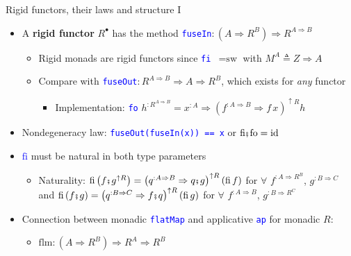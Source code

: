 \documentclass[english]{beamer}
\newcommand{\bef}{\hspace{0.5pt}\ensuremath\mathsmaller{\fatsemi}\hspace{1.5pt}}
\begin{document}
\begin{frame}{Rigid functors, their laws and structure I}

\begin{itemize}
\item {\footnotesize{}\vspace{-0.2cm}}A \textbf{rigid functor} $R^{\bullet}$
has the method \texttt{\textcolor{blue}{\footnotesize{}fuseIn}}$:\left(A\Rightarrow R^{B}\right)\Rightarrow R^{A\Rightarrow B}$
\begin{itemize}
\item Rigid monads are rigid functors since \texttt{\textcolor{blue}{\footnotesize{}fi
}}$=\text{sw}$ with $M^{A}\triangleq Z\Rightarrow A$
\item Compare with \texttt{\textcolor{blue}{\footnotesize{}fuseOut}}$:R^{A\Rightarrow B}\Rightarrow A\Rightarrow R^{B}$,
which exists for \emph{any} functor
\begin{itemize}
\item {\footnotesize{}\vspace{-0.3cm}}Implementation: \texttt{\textcolor{blue}{\footnotesize{}fo}}
$h^{:R^{A\Rightarrow B}}=x^{:A}\Rightarrow\left(f^{:A\Rightarrow B}\Rightarrow f\,x\right)^{\uparrow R}h$
\end{itemize}
\end{itemize}
\item {\footnotesize{}\vspace{-0.05cm}}Nondegeneracy law: \texttt{\textcolor{blue}{\footnotesize{}fuseOut(fuseIn(x))
== x}} or $\text{fi}\bef\text{fo}=\text{id}$
\item \texttt{\textcolor{blue}{\footnotesize{}$\text{fi}$}} must be natural
in both type parameters
\begin{itemize}
\item Naturality: $\text{fi}\left(f\bef g^{\uparrow R}\right)=\left(q^{:A\Rightarrow B}\Rightarrow q\bef g\right)^{\uparrow R}\left(\text{fi}\,f\right)$
for $\forall$ $f^{:A\Rightarrow R^{B}}$, $g^{:B\Rightarrow C}$
and $\text{fi}\left(f\bef g\right)=\left(q^{:B\Rightarrow C}\Rightarrow f\bef q\right)^{\uparrow R}\left(\text{fi}\,g\right)$
for $\forall$ $f^{:A\Rightarrow B}$, $g^{:B\Rightarrow R^{C}}$
\end{itemize}
\item {\small{}Connection between monadic }\texttt{\textcolor{blue}{\footnotesize{}flatMap}}
and applicative \texttt{\textcolor{blue}{\footnotesize{}ap}} for monadic
$R$:
\begin{itemize}
\item {\footnotesize{}$\text{flm}:\left(A\Rightarrow R^{B}\right)\Rightarrow R^{A}\Rightarrow R^{B}$}{\footnotesize\par}

\end{itemize}
\end{itemize}
\end{frame}
\end{document}

